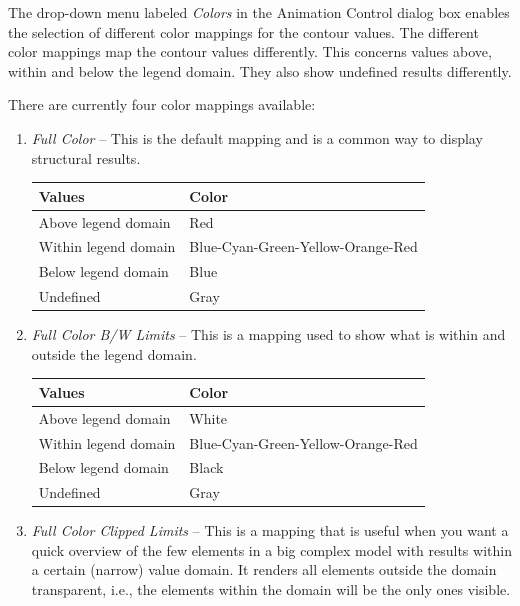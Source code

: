 

The drop-down menu labeled {\sl Colors} in the Animation Control dialog box
enables the selection of different color mappings for the contour values.
The different color mappings map the contour values differently.
This concerns values above, within and below the legend domain.
They also show undefined results differently.

There are currently four color mappings available:

\begin{enumerate}
  \setlength\itemsep{3mm}

\item{\sl Full Color} --
  This is the default mapping and is a common way to display structural results.

  \begin{tabular}{ | m{4.0cm} | m{6cm} | }
    \hline
    Values               & Color \\
    \hline\hline
    Above legend domain  & Red \\
    \hline
    Within legend domain & Blue-Cyan-Green-Yellow-Orange-Red \\
    \hline
    Below legend domain  & Blue \\
    \hline
    Undefined            & Gray \\
    \hline
\end{tabular}

\item{\sl Full Color B/W Limits} --
  This is a mapping used to show what is within and outside the legend domain.

  \begin{tabular}{ | m{4.0cm} | m{6cm} | }
    \hline
    Values               & Color \\
    \hline\hline
    Above legend domain  & White \\
    \hline
    Within legend domain & Blue-Cyan-Green-Yellow-Orange-Red \\
    \hline
    Below legend domain  & Black \\
    \hline
    Undefined            & Gray \\
    \hline
  \end{tabular}

\item{\sl Full Color Clipped Limits} --
  This is a mapping that is useful when you want a quick overview of the few
  elements in a big complex model with results within a certain (narrow) value
  domain. It renders all elements outside the domain transparent, i.e.,
  the elements within the domain will be the only ones visible.


\end{enumerate}
